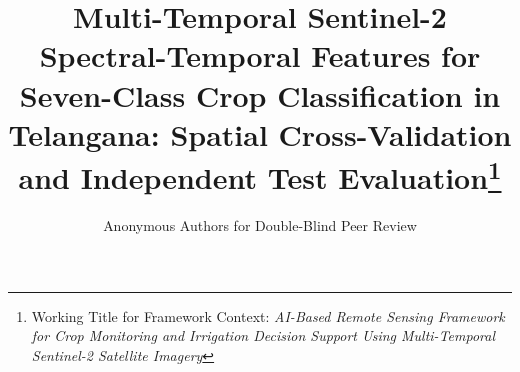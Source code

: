 \documentclass[runningheads]{llncs}
\begin{document}
\title{Multi-Temporal Sentinel-2 Spectral-Temporal Features for Seven-Class Crop Classification in Telangana: Spatial Cross-Validation and Independent Test Evaluation\thanks{Working Title for Framework Context: \emph{AI-Based Remote Sensing Framework for Crop Monitoring and Irrigation Decision Support Using Multi-Temporal Sentinel-2 Satellite Imagery}}}


\author{Anonymous Authors for Double-Blind Peer Review}

\maketitle
\end{document}
